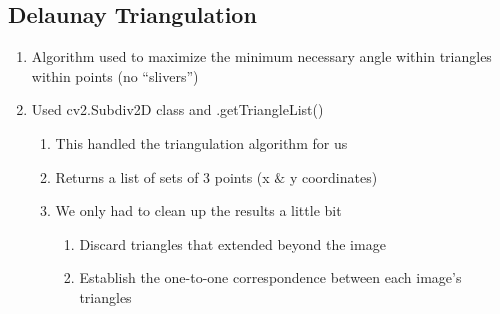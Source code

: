 \documentclass[journal]{IEEEtran}
\begin{document}
\subsection{Delaunay Triangulation}
\begin{enumerate}[label=\alph*)]
\item Algorithm used to maximize the minimum necessary angle within triangles within points (no “slivers”)
\item Used cv2.Subdiv2D class and .getTriangleList()
\begin{enumerate}[label=\roman*)]
	\item This handled the triangulation algorithm for us
	\item Returns a list of sets of 3 points (x $\&$ y coordinates)
	\item We only had to clean up the results a little bit
	\begin{enumerate}[label=\arabic*)]
		\item Discard triangles that extended beyond the image
		\item Establish the one-to-one correspondence between each image's triangles
	\end{enumerate}
\end{enumerate}
\end{enumerate}
\end{document}
